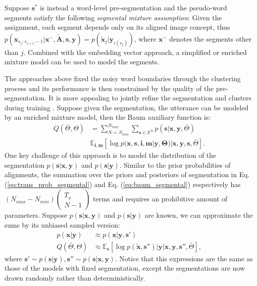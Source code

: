 \documentclass[journal]{IEEEtran}
\begin{document}
Suppose $\mathbf s^*$ is instead a word-level pre-segmentation and the pseudo-word segments satisfy the following \textit{segmental mixture assumption}: Given the assignment, each segment depends only on its aligned image concept, thus $p(\mathbf x_{s_j:s_{j+1}-1}|\mathbf x^{-}, \tilde{\mathbf{A}}, \mathbf s, \mathbf y) = p(\tilde{\mathbf x}_j|\mathbf y_{i(s_j)})$, where $\mathbf x^-$ denotes the segments other than $j$. Combined with the embedding vector approach, a simplified or enriched mixture model can be used to model the segments.

The approaches above fixed the noisy word boundaries through the clustering process and its performance is then constrained by the quality of the pre-segmentation. It is more appealing to jointly refine the segmentation and clusters during training \cite{Kamper2017}. Suppose given the segmentation, the utterance can be modeled by an enriched mixture model, then the Baum auxiliary function is:
\begin{align}\label{baum-besgmm}
    Q(\bar{\Theta}, \Theta) &= \sum_{N=N_{min}}^{N_{max}}\sum_{\mathbf s \in \mathcal S^N}p(\mathbf s|\mathbf x, \mathbf y, \bar{\Theta})\nonumber\\
    &\mathbb{E}_{\mathbf i, \mathbf m}\left[\log p(\mathbf x, \mathbf s, \mathbf i, \mathbf m|\mathbf y, \mathbf \Theta)|\mathbf x, \mathbf y, \mathbf s , \bar{\Theta}\right].
\end{align}
One key challenge of this approach is to model the distribution of the segmentation $p(\mathbf s|\mathbf x, \mathbf y)$ and $p(\mathbf s|\mathbf y)$. Similar to the prior probabilities of alignments, the summation over the priors and posteriors of segmentation in Eq. (\ref{eq:trans_prob_segmental}) and Eq. (\ref{eq:baum_segmental}) respectively has $(N_{max}-N_{min})\left(\begin{array}{c}
      T_x\\
     N-1
\end{array}\right)$ terms and requires an prohibitive amount of parameters. Suppose $p(\mathbf s|\mathbf x, \mathbf y)$ and $p(\mathbf s|\mathbf y)$ are known, we can approximate the sums by its unbiased sampled version:
\begin{align}\label{eq:baum-besgmm-sampled}
    p(\mathbf x|\mathbf y) &\approx p(\mathbf x|\mathbf y, \mathbf s')\\
    Q(\bar{\Theta}, \Theta) &\approx \mathbb{E}_{\mathbf s}\left[\log p(\tilde{\mathbf x}, \mathbf s'')|\mathbf y|\mathbf x, \mathbf y, \mathbf s'', \bar{\Theta}\right],
\end{align}
where $\mathbf s' \sim p(\mathbf s|\mathbf y), \mathbf s'' \sim p(\mathbf s|\mathbf x, \mathbf y)$. Notice that this expressions are the same as those of the models with fixed segmentation, except the segmentations are now drawn randomly rather than deterministically.
\end{document}
